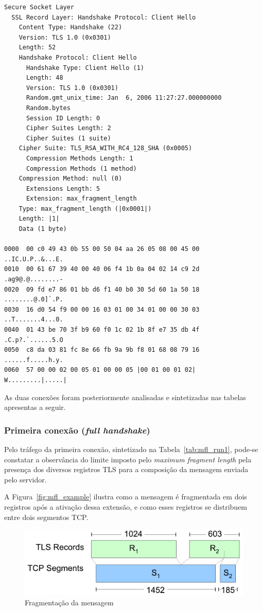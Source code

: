 \begin{lstlisting}[caption=Mensagem \tlsHsCh com a extensão \acs{MFL} habilitada]
Secure Socket Layer 
  SSL Record Layer: Handshake Protocol: Client Hello 
    Content Type: Handshake (22) 
    Version: TLS 1.0 (0x0301) 
    Length: 52 
    Handshake Protocol: Client Hello 
      Handshake Type: Client Hello (1) 
      Length: 48 
      Version: TLS 1.0 (0x0301) 
      Random.gmt_unix_time: Jan  6, 2006 11:27:27.000000000 
      Random.bytes 
      Session ID Length: 0 
      Cipher Suites Length: 2 
      Cipher Suites (1 suite) 
	Cipher Suite: TLS_RSA_WITH_RC4_128_SHA (0x0005) 
      Compression Methods Length: 1 
      Compression Methods (1 method) 
	Compression Method: null (0) 
      Extensions Length: 5 
      Extension: max_fragment_length 
	Type: max_fragment_length (|0x0001|) 
	Length: |1| 
	Data (1 byte) 

0000  00 c0 49 43 0b 55 00 50 04 aa 26 05 08 00 45 00   ..IC.U.P..&...E. 
0010  00 61 67 39 40 00 40 06 f4 1b 0a 04 02 14 c9 2d   .ag9@.@........- 
0020  09 fd e7 86 01 bb d6 f1 40 b0 30 5d 60 1a 50 18   ........@.0]`.P. 
0030  16 d0 54 f9 00 00 16 03 01 00 34 01 00 00 30 03   ..T.......4...0. 
0040  01 43 be 70 3f b9 60 f0 1c 02 1b 8f e7 35 db 4f   .C.p?.`......5.O 
0050  c8 da 03 81 fc 8e 66 fb 9a 9b f8 01 68 08 79 16   ......f.....h.y. 
0060  57 00 00 02 00 05 01 00 00 05 |00 01 00 01 02|      W.........|.....|
\end{lstlisting}

As duas conexões foram posteriormente analisadas e sintetizadas nas tabelas 
apresentas a seguir.

\subsubsection{Primeira conexão (\emph{full handshake})}

Pelo tráfego da primeira conexão, sintetizado na Tabela~\vref{tab:mfl_run1},
pode-se constatar a observância do limite imposto pelo \emph{maximum fragment length} 
pela presença dos diversos registros TLS para a composição da mensagem 
\tlsHsC enviada pelo servidor.

A Figura~\vref{fig:mfl_example} ilustra como a mensagem \tlsHsC é fragmentada em dois registros 
após a ativação dessa extensão, e como esses registros se distribuem entre dois segmentos TCP.


\begin{figure}[htb]
    \centering
        \includegraphics[scale=0.50]{fig/mfl_example}
    \caption{Fragmentação da mensagem \tlsHsC}
    \label{fig:mfl_example}
\end{figure}


